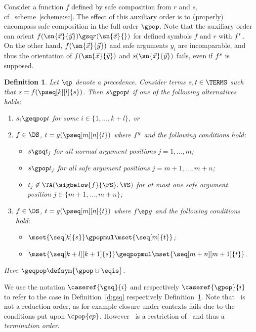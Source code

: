 \documentclass{LMCS}
\newtheorem{definition}[thm]{Definition}
\begin{document}
Consider a function $f$ defined by safe composition from $r$ and $s$, 
cf.~scheme~\eqref{scheme:sc}.
The effect of this auxiliary order is to (properly) encompass 
safe composition in the full order $\gpop$.
Note that the auxiliary order can orient $f(\sn{\vec{x}}{\vec{y}}) \gsq r(\sn{\vec{x}}{})$ for defined symbols $f$ and $r$
with $f \sp r$. 
On the other hand, $f(\sn{\vec{x}}{\vec{y}})$ and safe arguments $y_i$ are incomparable,
and thus the orientation of $f(\sn{\vec{x}}{\vec{y}})$ and $s(\sn{\vec{x}}{\vec{y}})$ fails, even if $f \sp s$ is supposed.

\begin{definition}\label{d:gpop}
  Let ${\qp}$ denote a precedence.  
  Consider terms $s, t \in \TERMS$ such that $s = f(\pseq[k][l]{s})$.
  Then $s \gpop t$ if one of the following alternatives holds:
  \begin{enumerate}[labelsep=*,leftmargin=*]
  \item\label{d:gpop:st} $s_i \geqpop t$ for some $i \in \{1,\dots,k+l\}$, or
  \item\label{d:gpop:ia} $f \in \DS$, $t = g(\pseq[m][n]{t})$ where $f \sp g$ 
    and the following conditions hold:
    \begin{itemize}
    \item $s \gsq t_j$ for all normal argument positions $j = 1,\dots,m$;
    \item $s \gpop t_j$ for all safe argument positions $j = m+1,\dots,m+n$;
    \item $t_j \not\in \TA(\sigbelow{f}{\FS},\VS)$ for at most one safe argument position $j \in \{m+1,\dots,m+n\}$;
    \end{itemize}
  \item\label{d:gpop:ep} $f \in \DS$, $t = g(\pseq[m][n]{t})$ where $f \ep g$
    and the following conditions hold:
    \begin{itemize}
    \item $\mset{\seq[k]{s}} \gpopmul \mset{\seq[m]{t}}$;
    \item $\mset{\seq[k+l][k+1]{s}} \geqpopmul \mset{\seq[m+n][m+1]{t}}$.
    \end{itemize}
  \end{enumerate}
  Here ${\geqpop} \defsym {\gpop \cup \eqis}$.
\end{definition}

We use the notation $\caseref{\gsq}{i}$ and respectively $\caseref{\gpop}{i}$ 
to refer to the  case in Definition~\ref{d:gsq} respectively 
Definition~\ref{d:gpop}.
Note that \POPSTAR\ is not a reduction order, as for example
closure under contexts fails due to the conditions put
upon $\cpop{ep}$. However \POPSTAR\ is a restriction of \MPO\ and
thus a \emph{termination order}.
\end{document}
